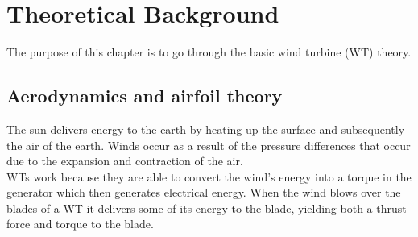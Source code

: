 \section{Theoretical Background} \label{sec:theory}
The purpose of this chapter is to go through the basic wind turbine (WT) theory. 

\subsection{Aerodynamics and airfoil theory}
The sun delivers energy to the earth by heating up the surface and subsequently the air of the earth. Winds occur as a result of the pressure differences that occur due to the expansion and contraction of the air. \\

WTs work because they are able to convert the wind's energy into a torque in the generator which then generates electrical energy. When the wind blows over the blades of a WT it delivers some of its energy to the blade, yielding both a thrust force and torque to the blade.

